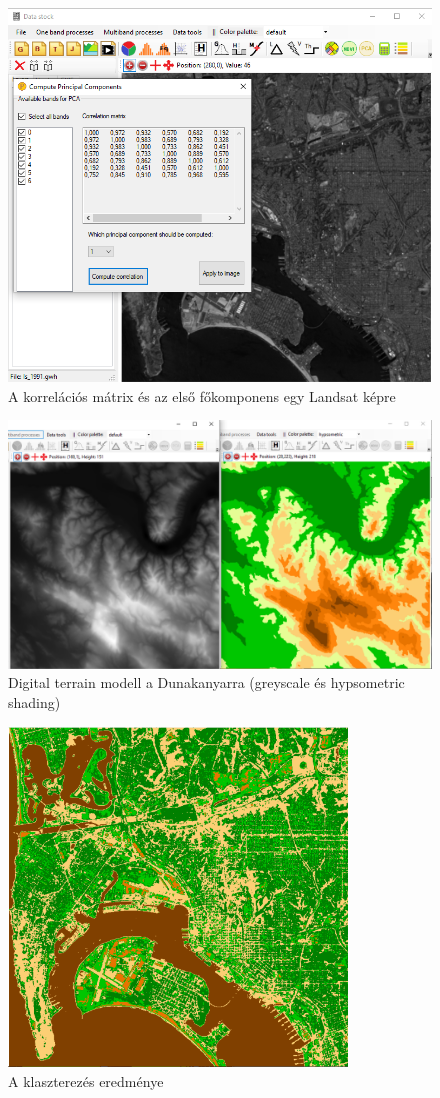 \documentclass[a4paper,12pt]{article}
\begin{document}
\begin{figure}
	\centering
	\includegraphics[width=12cm]{pca2.png}
	\caption{A korrelációs mátrix és az első főkomponens egy Landsat képre}
	\label{fig:pca2}
\end{figure}

\begin{figure}
	\centering
	\includegraphics[width=12cm]{dtm.png}
	\caption{Digital terrain modell a Dunakanyarra (greyscale és hypsometric shading)}
	\label{fig:dtm}
\end{figure}

\begin{figure}
	\centering
	\includegraphics[width=9cm]{cluster.png}
	\caption{A klaszterezés eredménye}
	\label{fig:cluster}
\end{figure}
\end{document}
